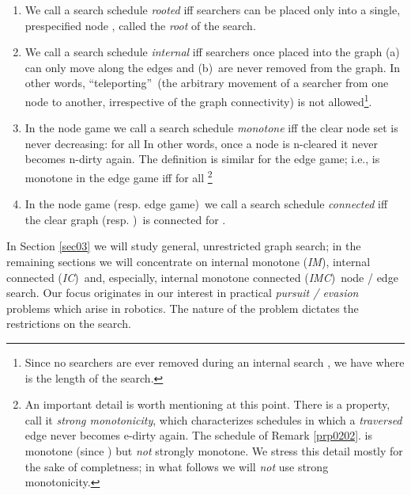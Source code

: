 \documentclass[11pt]{article}\usepackage{amsmath}
\begin{document}
\begin{enumerate}
\item We call a search schedule \emph{rooted }iff searchers can be placed only
into a single, prespecified node , called the \emph{root} of the search.

\item We call a search schedule \emph{internal }iff searchers once placed into
the graph (a) can only move along the edges and (b)\ are never removed from
the graph. In other words, \textquotedblleft teleporting\textquotedblright \ (the arbitrary movement of a searcher from one node to another, irrespective
of the graph connectivity) is not allowed\footnote{Since no searchers are ever
removed during an internal search , we have  where  is
the length of the search.}.

\item In the node game we call a search schedule  \emph{monotone
}iff the clear node set is never decreasing:  for all  In other words, once a
node is n-cleared it never becomes n-dirty again. The definition is similar
for the edge game; i.e.,  is monotone in the edge game iff
 for all
\footnote{An important detail is worth mentioning at this point. There is
a property, call it \emph{strong monotonicity}, which characterizes schedules
in which a \emph{traversed} edge never becomes e-dirty again. The schedule of
Remark \ref{prp0202}. is monotone (since ) but \emph{not }strongly monotone. We
stress this detail mostly for the sake of completness; in what follows we will
\emph{not} use strong monotonicity.} \ 

\item In the node game (resp. edge game)\ we call a search schedule
\emph{connected }iff the clear graph 
(resp. )\ is connected for .
\end{enumerate}

In Section \ref{sec03} we will study general, unrestricted graph search; in
the remaining sections we will concentrate on internal monotone (\emph{IM}),
internal connected (\emph{IC})\ and, especially, internal monotone connected
(\emph{IMC})\ node / edge search. Our focus originates in our interest in
practical \emph{pursuit / evasion }problems which arise in robotics. The
nature of the problem dictates the restrictions on the search.
\end{document}
